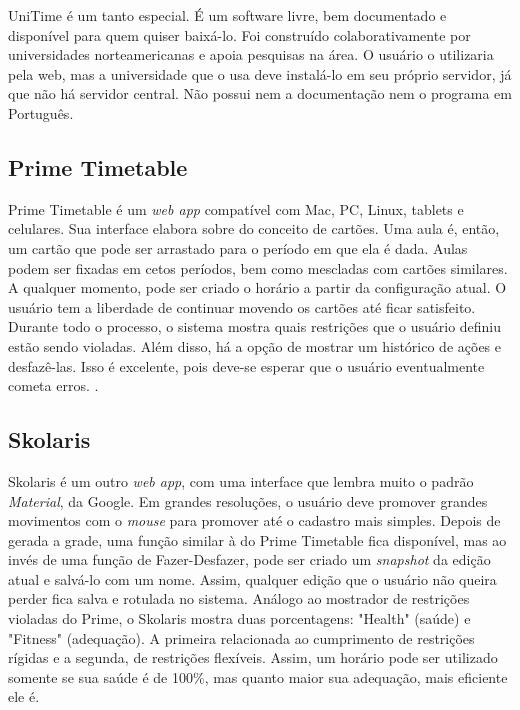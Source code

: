\documentclass{subfiles}
\begin{document}
	\par UniTime é um tanto especial. É um software livre, bem documentado e disponível para quem quiser baixá-lo. Foi construído colaborativamente por universidades norteamericanas e apoia pesquisas na área. O usuário o utilizaria pela web, mas a universidade que o usa deve instalá-lo em seu próprio servidor, já que não há servidor central. Não possui nem a documentação nem o programa em Português.

\subsection{Prime Timetable}

	\par Prime Timetable é um \textit{web app} compatível com Mac, PC, Linux, tablets e celulares. Sua interface elabora sobre do conceito de cartões. Uma aula é, então, um cartão que pode ser arrastado para o período em que ela é dada. Aulas podem ser fixadas em cetos períodos, bem como mescladas com cartões similares. A qualquer momento, pode ser criado o horário a partir da configuração atual. O usuário tem a liberdade de continuar movendo os cartões até ficar satisfeito. Durante todo o processo, o sistema mostra quais restrições que o usuário definiu estão sendo violadas. Além disso, há a opção de mostrar um histórico de ações e desfazê-las. Isso é excelente, pois deve-se esperar que o usuário eventualmente cometa erros. \cite{norman, gnome_hig}.

\subsection{Skolaris}

	\par Skolaris é um outro \textit{web app}, com uma interface que lembra muito o padrão \textit{Material}, da Google. Em grandes resoluções, o usuário deve promover grandes movimentos com o \textit{mouse} para promover até o cadastro mais simples. Depois de gerada a grade, uma função similar à do Prime Timetable fica disponível, mas ao invés de uma função de Fazer-Desfazer, pode ser criado um \textit{snapshot} da edição atual e salvá-lo com um nome. Assim, qualquer edição que o usuário não queira perder fica salva e rotulada no sistema. Análogo ao mostrador de restrições violadas do Prime, o Skolaris mostra duas porcentagens: "Health" (saúde) e "Fitness" (adequação). A primeira relacionada ao cumprimento de restrições rígidas e a segunda, de restrições flexíveis. Assim, um horário pode ser utilizado somente se sua saúde é de 100\%, mas quanto maior sua adequação, mais eficiente ele é.
\end{document}
